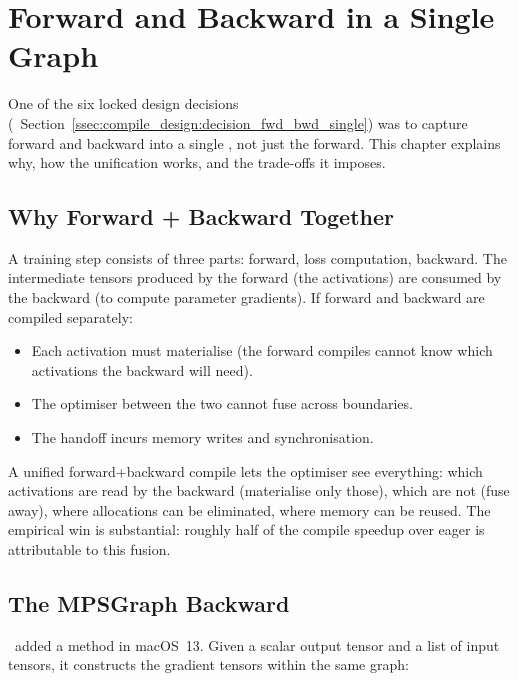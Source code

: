 \chapter{Forward and Backward in a Single Graph}
\label{ch:fwd_bwd_compile}

One of the six locked design decisions
(~Section~\ref{ssec:compile_design:decision_fwd_bwd_single})
was to capture forward and backward into a single \MPSGraph,
not just the forward. This chapter explains why, how the
unification works, and the trade-offs it imposes.

\section{Why Forward + Backward Together}
\label{sec:fwd_bwd_compile:why}

A training step consists of three parts: forward, loss
computation, backward. The intermediate tensors produced by the
forward (the activations) are consumed by the backward (to
compute parameter gradients). If forward and backward are
compiled separately:

\begin{itemize}
  \item Each activation must materialise (the forward compiles
    cannot know which activations the backward will need).
  \item The optimiser between the two cannot fuse across
    boundaries.
  \item The handoff incurs memory writes and synchronisation.
\end{itemize}

A unified forward+backward compile lets the optimiser see
everything: which activations are read by the backward
(materialise only those), which are not (fuse away), where
allocations can be eliminated, where memory can be reused. The
empirical win is substantial: roughly half of the compile
speedup over eager is attributable to this fusion.

\section{The MPSGraph Backward}
\label{sec:fwd_bwd_compile:mpsgraph_backward}

\MPSGraph\ added a
 method in
macOS~13. Given a scalar output tensor and a list of input
tensors, it constructs the gradient tensors within the same
graph:

